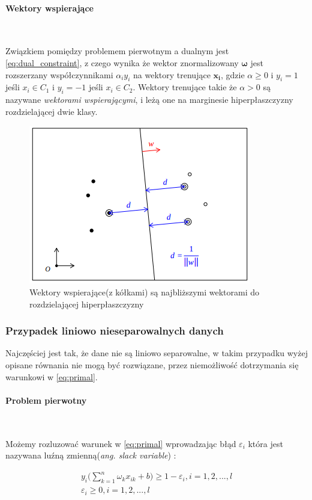 \documentclass[paper=a4, fontsize=11pt]{scrartcl} %
\numberwithin{equation}{section} %
\numberwithin{figure}{section} %
\newcommand{\myparagraph}[1]{\paragraph{#1}\mbox{}\\}
\begin{document}
\myparagraph{Wektory wspierające}
    \par Związkiem pomiędzy problemem pierwotnym a dualnym jest \ref{eq:dual_constraint}, z
    czego wynika że wektor znormalizowany $\pmb{\omega}$ jest rozszerzany współczynnikami
    $\alpha_i y_i$ na wektory trenujące $\pmb{x_i}$, gdzie $\alpha \geq 0$ i $y_i = 1$ jeśli
    $x_i \in C_1$ i $y_i = -1$ jeśli $x_i \in C_2$. Wektory trenujące takie że $\alpha > 0$ są
    nazywane \textit{wektorami wspierającymi}, i leżą one na marginesie hiperpłaszczyzny
    rozdzielającej dwie klasy.

    \begin{figure}[H]
        \begin{center}
            \includegraphics[scale=0.8]{./img/suport_vectors.png}
            \caption{Wektory wspierające(z kółkami) są najbliższymi wektorami do rozdzielającej
            hiperpłaszczyzny \cite{nefedov2016support}}
        \end{center}
    \end{figure}


\subsubsection{Przypadek liniowo nieseparowalnych danych}
    \par Najczęściej jest tak, że dane nie są liniowo separowalne, w takim przypadku wyżej
    opisane równania nie mogą być rozwiązane, przez niemożliwość dotrzymania się warunkowi w
    \ref{eq:primal}.

\myparagraph{Problem pierwotny}
    \par Możemy rozluzować warunek w \ref{eq:primal} wprowadzając błąd $\varepsilon_i$ która 
    jest nazywana luźną zmienną(\textit{ang. slack variable}) \cite{nefedov2016support}:

    \begin{equation}
        \begin{split}
        y_i \bigg(\sum\limits_{k=1}^n \omega_k x_{ik} + b \bigg) \geq 1 - \varepsilon_i,
        i=1,2,...,l \\
        \varepsilon_i \geq 0, i=1,2,...,l
        \end{split}
    \end{equation}
\end{document}
